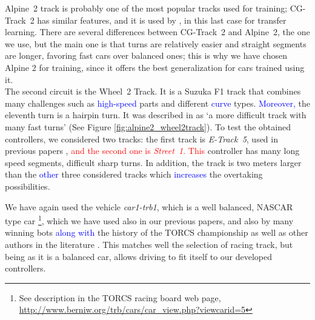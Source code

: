 \documentclass[10pt,journal,compsoc]{IEEEtran}
\begin{document}
\mbox{Alpine 2} track is probably one of the most popular tracks used for
training; \mbox{CG-Track 2} has similar features, and it is used by
\cite{mirus2019short,8833873,verma2018programmatically},
in this last case for transfer learning. There are several differences between \mbox{CG-Track 2} and \mbox{Alpine 2}, the one we use, but the main one is that turns are relatively easier and straight segments are longer, favoring fast cars over balanced ones; this is why we have chosen Alpine 2 for training, since
it offers the best generalization for cars trained using it.\\
The second circuit is the \mbox{Wheel 2} Track. It is a  Suzuka F1 track that combines many challenges such as  \textcolor{blue}{high-speed} parts and different  \textcolor{blue}{curve} types.  \textcolor{blue}{Moreover,} the eleventh turn is a hairpin turn. It was  described in \cite{wheel2track_chen} as `a more difficult track with many fast turns' (See Figure \ref{fig:alpine2_wheel2track}).
To test the obtained controllers, we considered two tracks: the first track is \mbox{\textit{E-Track 5}}, used in previous papers \cite{salem_evo17},\cite{salem_evo18} \textcolor{red}{and the second one is \mbox{\textit{Street 1}}.
This }controller has many long speed segments, difficult sharp turns. In addition, the track is two meters larger than the  \textcolor{blue}{other}  three considered tracks which  \textcolor{blue}{increases} the overtaking possibilities.

We have again used the vehicle \mbox{\textit{car1-trb1}},
which is a well balanced, NASCAR type car \footnote{See description in
  the TORCS racing board web page,
  \url{http://www.berniw.org/trb/cars/car_view.php?viewcarid=5}},
which we have used also in our previous papers, and also by many
winning bots  \textcolor{blue}{along with} the history of the TORCS championship
\cite{torcs5} as well as other authors in the literature
\cite{auteur2010}. This matches well the selection
of racing track, but being as it is a balanced car, allows driving to
fit itself to our developed controllers.
\end{document}
